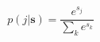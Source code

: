 \begin{equation}
    p(j|\mathbf{s}) = \frac{e^{s_j}}{\sum_{k} e^{s_k}}
    \label{eq:softmax}
\end{equation}
